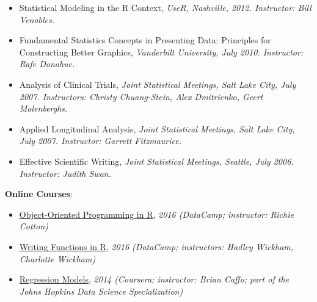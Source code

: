 \documentclass[5pt]{article}
\begin{document}
\begin{itemize}
\item Statistical Modeling in the R Context, \emph{UseR, Nashville, 2012. Instructor: Bill Venables.}
\item Fundamental Statistics Concepts in Presenting Data: Principles for Constructing Better Graphics, \emph{Vanderbilt University, July 2010. Instructor: Rafe Donahue.}
\item Analysis of Clinical Trials, \emph{Joint Statistical Meetings, Salt Lake City, July 2007. Instructors: Christy Chuang-Stein, Alex Dmitrienko, Geert Molenberghs.}
\item Applied Longitudinal Analysis, \emph{Joint Statistical Meetings, Salt Lake City, July 2007. Instructor: Garrett Fitzmaurice.}
\item Effective Scientific Writing, \emph{Joint Statistical Meetings, Seattle, July 2006. Instructor: Judith Swan.}
\end{itemize}

\noindent \textbf{Online Courses}:
\begin{itemize}
\item \href{https://www.datacamp.com/courses/object-oriented-programming-in-r-s3-and-r6}{Object-Oriented Programming in R}, \emph{2016 (DataCamp; instructor: Richie Cotton)}
\item \href{https://www.datacamp.com/courses/writing-functions-in-r}{Writing Functions in R}, \emph{2016 (DataCamp; instructors: Hadley Wickham, Charlotte Wickham)}
\item \href{https://www.coursera.org/learn/regression-models}{Regression Models}, \emph{2014 (Coursera; instructor: Brian Caffo; part of the Johns Hopkins Data Science Specialization)}
\end{itemize}
\end{document}
